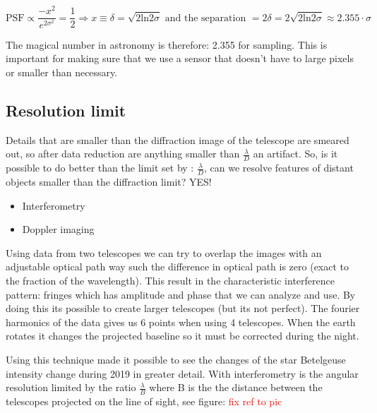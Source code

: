 		 \begin{equation}
		 	\text{PSF} \propto \frac{-x^2} {e^{2\sigma^2}} = \frac{1} {2} \Rightarrow x  \equiv \delta = \sqrt{2 \text{ln}2\sigma} \text{ and the separation } = 2\delta= 2  \sqrt{2 \text{ln}2\sigma} \approx 2.355 \cdot \sigma 
		 \end{equation}

	The magical number in astronomy is therefore: 2.355 for sampling. This is important for making sure that we use a sensor that doesn't have to large pixels or smaller than necessary. 

	\subsection{Resolution limit}
	Details that are smaller than the diffraction image of the telescope are smeared out, so after data reduction are anything smaller than $\frac{\lambda} {D} $ an artifact. So, is it possible to do better than the limit set by : $\frac{\lambda} {D} $, can we resolve features of distant objects smaller than the diffraction limit? YES!

		\begin{itemize}
		  	\item Interferometry 
		  	\item Doppler imaging
		  \end{itemize}  
	
	Using data from two telescopes we can try to overlap the images with an adjustable optical path way such the difference in optical path is zero (exact to the fraction of the wavelength). This result in the characteristic interference pattern: fringes which has amplitude and phase that we can analyze and use. By doing this its possible to create larger telescopes (but its not perfect). The fourier harmonics of the data gives us 6 points when using 4 telescopes. When the earth rotates it changes the projected baseline so it must be corrected during the night. 

	Using this technique made it possible to see the changes of the star Betelgeuse intensity change during 2019 in greater detail. With interferometry is the angular resolution limited by the ratio $\frac{\lambda} {B} $ where B is the the distance between the telescopes projected on the line of sight, see figure: \textcolor{red}{fix ref to pic} 	 

